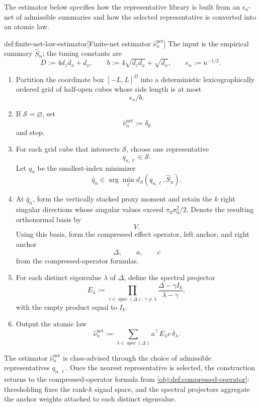 \documentclass[11pt]{article}
\begin{document}
The estimator below specifies how the representative library is built from an \(\epsilon_n\)-net of admissible summaries and how the selected representative is converted into an atomic law.

\begin{algorithmv}{def:finite-net-law-estimator}[Finite-net estimator \(\widehat\nu_n^{\mathrm{net}}\)]
The input is the empirical summary \(\widehat S_n\); the tuning constants are
\[
D:=4d_zd_x+d_x,\qquad
b:=4\sqrt{d_zd_x}+\sqrt{d_x},\qquad
\epsilon_n:=n^{-1/2}.
\]
\begin{enumerate}
\item Partition the coordinate box \([-L,L]^D\) into a deterministic lexicographically ordered grid of half-open cubes whose side length is at most
\[
\epsilon_n/b.
\]

\item If \(\mathscr S=\varnothing\), set
\[
\widehat\nu_n^{\mathrm{net}}:=\delta_0
\]
and stop.

\item For each grid cube that intersects \(\mathscr S\), choose one representative
\[
q_{n,\ell}\in\mathscr S.
\]
Let \(\widehat q_n\) be the smallest-index minimizer
\[
\widehat q_n
\in
\arg\min_{\ell} d_S(q_{n,\ell},\widehat S_n).
\]

\item At \(\widehat q_n\), form the vertically stacked proxy moment and retain the \(k\) right singular directions whose singular values exceed \(\pi_0\sigma_0^2/2\). Denote the resulting orthonormal basis by
\[
V.
\]
Using this basis, form the compressed effect operator, left anchor, and right anchor
\[
\Delta,\qquad a,\qquad c
\]
from the compressed-operator formulas.

\item For each distinct eigenvalue \(\lambda\) of \(\Delta\), define the spectral projector
\[
E_\lambda
:=
\prod_{\gamma\in\operatorname{spec}(\Delta):\,\gamma\ne\lambda}
\frac{\Delta-\gamma I_k}{\lambda-\gamma},
\]
with the empty product equal to \(I_k\).

\item Output the atomic law
\[
\widehat\nu_n^{\mathrm{net}}
:=
\sum_{\lambda\in\operatorname{spec}(\Delta)}
a^\top E_\lambda c\,\delta_\lambda .
\]
\end{enumerate}
\end{algorithmv}

The estimator \(\widehat\nu_n^{\mathrm{net}}\) is class-advised through the choice of admissible representatives \(q_{n,\ell}\). Once the nearest representative is selected, the construction returns to the compressed-operator formula from \cref{obj:def:compressed-operator}: thresholding fixes the rank-\(k\) signal space, and the spectral projectors aggregate the anchor weights attached to each distinct eigenvalue.
\end{document}
